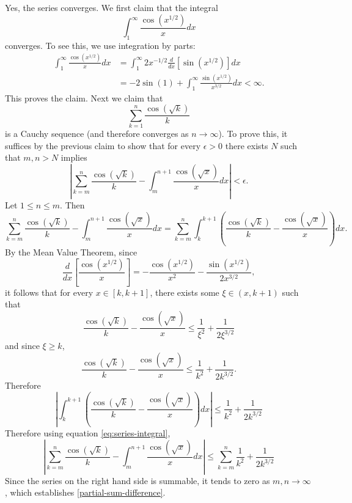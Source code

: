 \documentclass{exam}
\theoremstyle{problemstyle}
\newcommand{\1}[1]{\textbf{1}_{\left[#1\right]}} %
\def\({\left (}
\def\){\right )}
\begin{document}
\begin{questions}
\begin{solution}
Yes, the series converges. We first claim that the integral
%
\[ \int_{1}^{\infty}\frac{\cos(x^{1/2})}{x}dx \]
%
converges. To see this, we use integration by parts:
  \begin{align*}
    \int_{1}^{\infty}\frac{\cos(x^{1/2})}{x}dx
    &= \int_{1}^{\infty}2x^{-1/2}\frac{d}{dx}\left[ \sin(x^{1/2}) \right]dx\\
    &= -2\sin(1)+ \int_{1}^{\infty}\frac{\sin(x^{1/2})}{x^{3/2}}dx<\infty.
  \end{align*}
  This proves the claim. Next we claim that
  \[ \sum_{k=1}^{n} \frac{\cos(\sqrt{k})}{k} \]
  is a Cauchy sequence (and therefore converges as $n\to\infty$). To prove this, it suffices by the previous claim to show that for every $\epsilon>0$ there exists $N$ such that $m,n>N$ implies 
  \begin{equation}\label{partial-sum-difference}
    \left|\sum_{k=m}^{n}\frac{\cos(\sqrt{k})}{k} - \int_{m}^{n+1}\frac{\cos(\sqrt{x})}{x}dx\right|<\epsilon.
  \end{equation}
  Let $1\leq n \leq m$. Then
  \begin{equation}\label{eq:series-integral}
    \sum_{k=m}^{n}\frac{\cos(\sqrt{k})}{k} - \int_{m}^{n+1}\frac{\cos(\sqrt{x})}{x}dx
    = \sum_{k=m}^{n}\int_{k}^{k+1}\(\frac{\cos(\sqrt{k})}{k} - \frac{\cos(\sqrt{x})}{x}\)dx.
  \end{equation}
  By the Mean Value Theorem, since
  \[ \frac{d}{dx}\left[ \frac{\cos(x^{1/2})}{x} \right]= -\frac{\cos(x^{1/2})}{x^{2}} - \frac{\sin(x^{1/2})}{2x^{3/2}}, \]
  it follows that for every $x\in [k,k+1]$, there exists some $\xi\in (x,k+1)$ such that
  \begin{equation*}
    \frac{\cos(\sqrt{k})}{k} - \frac{\cos(\sqrt{x})}{x} \leq \frac{1}{\xi^{2}}+ \frac{1}{2\xi^{3/2}}
  \end{equation*}
  and since $\xi \geq k$,
  \begin{equation*}
     \frac{\cos(\sqrt{k})}{k} - \frac{\cos(\sqrt{x})}{x} \leq\frac{1}{k^{2}} + \frac{1}{2k^{3/2}}.
   \end{equation*}
   Therefore
  \begin{equation*}
    \left|\int_{k}^{k+1}\(\frac{\cos(\sqrt{k})}{k} - \frac{\cos(\sqrt{x})}{x}\)dx\right| \leq  \frac{1}{k^{2}} + \frac{1}{2k^{3/2}}
  \end{equation*}
  Therefore using equation \eqref{eq:series-integral},
  \begin{equation*}
    \left| \sum_{k=m}^{n}\frac{\cos(\sqrt{k})}{k} - \int_{m}^{n+1}\frac{\cos(\sqrt{x})}{x}dx \right| \leq \sum_{k=m}^{n}\frac{1}{k^{2}} + \frac{1}{2k^{3/2}}
  \end{equation*}
  Since the series on the right hand side is summable, it tends to zero as $m,n\to\infty$, which establishes \eqref{partial-sum-difference}.
\end{solution}





\end{questions}
\end{document}
